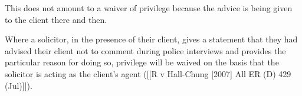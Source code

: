 \documentclass[
]{article}
\begin{document}
This does not amount to a waiver of privilege because the advice is
being given to the client there and then.

Where a solicitor, in the presence of their client, gives a statement
that they had advised their client not to comment during police
interviews and provides the particular reason for doing so, privilege
will be waived on the basis that the solicitor is acting as the client's
agent ({[}{[}R v Hall-Chung {[}2007{]} All ER (D) 429 (Jul){]}{]}).
\end{document}
